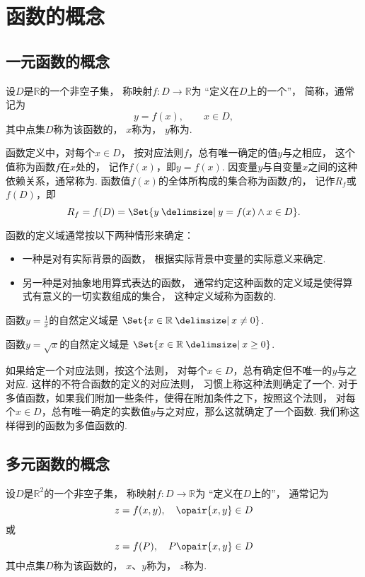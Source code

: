 \section{函数的概念}
\subsection{一元函数的概念}
设\(D\)是\(\mathbb{R}\)的一个非空子集，
称映射\(f\colon D \to \mathbb{R}\)为
“定义在\(D\)上的一个”，
简称，通常记为\[
	y = f(x), \qquad x \in D,
\]
其中点集\(D\)称为该函数的，
\(x\)称为，
\(y\)称为.

函数定义中，对每个\(x \in D\)，
按对应法则\(f\)，总有唯一确定的值\(y\)与之相应，
这个值称为函数\(f\)在\(x\)处的，
记作\(f(x)\)，即\(y=f(x)\).
因变量\(y\)与自变量\(x\)之间的这种依赖关系，通常称为.
函数值\(f(x)\)的全体所构成的集合称为函数\(f\)的，
记作\(R_f\)或\(f(D)\)，即\[
	R_f = f(D) = \Set{ y \given y = f(x) \land x \in D }.
\]

函数的定义域通常按以下两种情形来确定：
\begin{itemize}
	\item 一种是对有实际背景的函数，
	根据实际背景中变量的实际意义来确定.
	\item 另一种是对抽象地用算式表达的函数，
	通常约定这种函数的定义域是使得算式有意义的一切实数组成的集合，
	这种定义域称为函数的.
\end{itemize}

\begin{example}
函数\(y = \frac{1}{x}\)的自然定义域是
\(\Set{ x \in \mathbb{R} \given x \neq 0 }\).
\end{example}

\begin{example}
函数\(y = \sqrt{x}\)的自然定义域是
\(\Set{ x \in \mathbb{R} \given x \geq 0 }\).
\end{example}

如果给定一个对应法则，按这个法则，
对每个\(x \in D\)，总有确定但不唯一的\(y\)与之对应.
这样的不符合函数的定义的对应法则，
习惯上称这种法则确定了一个.
对于多值函数，如果我们附加一些条件，使得在附加条件之下，按照这个法则，
对每个\(x \in D\)，总有唯一确定的实数值\(y\)与之对应，那么这就确定了一个函数.
我们称这样得到的函数为多值函数的.

\subsection{多元函数的概念}
\begin{definition}
设\(D\)是\(\mathbb{R}^2\)的一个非空子集，
称映射\(f\colon D \to \mathbb{R}\)为
“定义在\(D\)上的”，
通常记为\[
	z = f(x,y),
	\quad \opair{x,y} \in D
\]或\[
	z = f(P),
	\quad P\opair{x,y} \in D
\]
其中点集\(D\)称为该函数的，
\(x\)、\(y\)称为，
\(z\)称为.
\end{definition}

